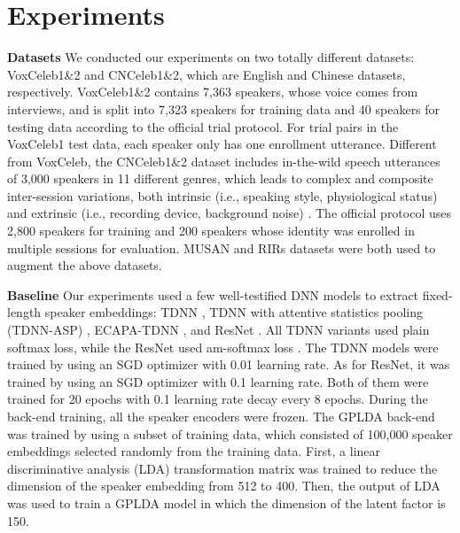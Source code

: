 \documentclass{article}
\begin{document}
\section{Experiments}
\vspace{-1mm}
\label{sec:typestyle}

\textbf{Datasets}
We conducted our experiments on two totally different datasets: VoxCeleb1\&2 and CNCeleb1\&2, which are English and Chinese datasets, respectively. VoxCeleb1\&2 contains 7,363 speakers, whose voice comes from interviews, and is split into 7,323 speakers for training data and 40 speakers for testing data according to the official trial protocol. For trial pairs in the VoxCeleb1 test data, each speaker only has one enrollment utterance. Different from VoxCeleb, the CNCeleb1\&2 dataset includes in-the-wild speech utterances of 3,000 speakers in 11 different genres, which leads to complex and composite inter-session variations, both intrinsic (i.e., speaking style, physiological status) and extrinsic (i.e., recording device, background noise) \cite{Li2020-CN2}.  The official protocol uses 2,800 speakers for training and 200 speakers whose identity was enrolled in multiple sessions for evaluation. MUSAN \cite{musan} and RIRs \cite{rirs} datasets were both used to augment the above datasets.

\noindent
\textbf{Baseline}
Our experiments used a few well-testified DNN models to extract fixed-length speaker embeddings: TDNN \cite{Snyder2018-XV}, TDNN with attentive statistics pooling (TDNN-ASP) \cite{asp}, ECAPA-TDNN \cite{ecapa}, and ResNet \cite{He2016-ResNet}. All TDNN variants used plain softmax loss, while the ResNet used  am-softmax loss \cite{Wang2018-LMCL}. The TDNN models were trained by using an SGD optimizer with 0.01 learning rate. As for ResNet, it was trained by using an SGD optimizer with 0.1 learning rate. Both of them were trained for 20 epochs with 0.1 learning rate decay every 8 epochs. During the back-end training, all the speaker encoders were frozen.
The GPLDA back-end was trained by using a subset of training data, which consisted of 100,000 speaker embeddings selected randomly from the training data. First, a linear discriminative analysis (LDA) transformation matrix was trained to reduce the dimension of the speaker embedding from 512 to 400. Then, the output of LDA was used to train a GPLDA model in which the dimension of the latent factor is 150. 
\end{document}
